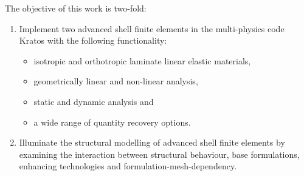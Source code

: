 The objective of this work is two-fold:
\begin{enumerate}
	\item Implement two advanced shell finite elements in the multi-physics code Kratos with the following functionality:
	\begin{itemize}
		\item isotropic and orthotropic laminate linear elastic materials,
		\item geometrically linear and non-linear analysis,
		\item static and dynamic analysis and
		\item a wide range of quantity recovery options.\\
	\end{itemize}

	\item Illuminate the structural modelling of advanced shell finite elements by examining the interaction between structural behaviour, base formulations, enhancing technologies and formulation-mesh-dependency.
\end{enumerate}


